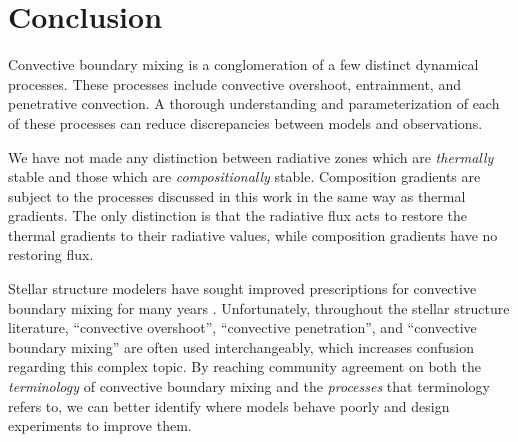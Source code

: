 \section{Conclusion}
\label{sec:conclusions}
Convective boundary mixing is a conglomeration of a few distinct dynamical processes.
These processes include convective overshoot, entrainment, and penetrative convection.
A thorough understanding and parameterization of each of these processes can reduce discrepancies between models and observations.

We have not made any distinction between radiative zones which are \emph{thermally} stable and those which are \emph{compositionally} stable.
Composition gradients are subject to the processes discussed in this work in the same way as thermal gradients.
The only distinction is that the radiative flux acts to restore the thermal gradients to their radiative values, while composition gradients have no restoring flux.

Stellar structure modelers have sought improved prescriptions for convective boundary mixing for many years \citep{mesa1, mesa4, mesa5}.
Unfortunately, throughout the stellar structure literature, ``convective overshoot'', ``convective penetration'', and ``convective boundary mixing'' are often used interchangeably, which increases confusion regarding this complex topic.
By reaching community agreement on both the \emph{terminology} of convective boundary mixing and the \emph{processes} that terminology refers to, we can better identify where models behave poorly and design experiments to improve them.


